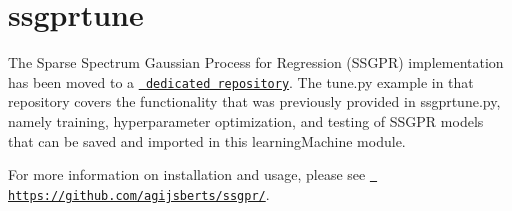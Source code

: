 \chapter{ssgprtune}
\hypertarget{md_icub-main_2src_2modules_2learningMachine_2scripts_2README}{}\label{md_icub-main_2src_2modules_2learningMachine_2scripts_2README}
\label{md_icub-main_2src_2modules_2learningMachine_2scripts_2README_autotoc_md35}%
%
The Sparse Spectrum Gaussian Process for Regression (SSGPR) implementation has been moved to a \href{https://github.com/agijsberts/ssgpr/}{\texttt{ dedicated repository}}. The {\ttfamily tune.\+py} example in that repository covers the functionality that was previously provided in {\ttfamily ssgprtune.\+py}, namely training, hyperparameter optimization, and testing of SSGPR models that can be saved and imported in this {\ttfamily learning\+Machine} module.

For more information on installation and usage, please see \href{https://github.com/agijsberts/ssgpr/}{\texttt{ https\+://github.\+com/agijsberts/ssgpr/}}. 
